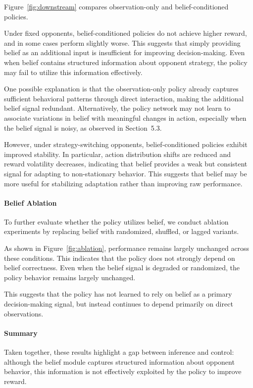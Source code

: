 \documentclass{article}
\begin{document}
Figure~\ref{fig:downstream} compares observation-only and belief-conditioned policies.

Under fixed opponents, belief-conditioned policies do not achieve higher reward, and in some cases perform slightly worse. 
This suggests that simply providing belief as an additional input is insufficient for improving decision-making. 
Even when belief contains structured information about opponent strategy, the policy may fail to utilize this information effectively.

One possible explanation is that the observation-only policy already captures sufficient behavioral patterns through direct interaction, 
making the additional belief signal redundant. 
Alternatively, the policy network may not learn to associate variations in belief with meaningful changes in action, 
especially when the belief signal is noisy, as observed in Section~5.3.

However, under strategy-switching opponents, belief-conditioned policies exhibit improved stability. 
In particular, action distribution shifts are reduced and reward volatility decreases, 
indicating that belief provides a weak but consistent signal for adapting to non-stationary behavior. 
This suggests that belief may be more useful for stabilizing adaptation rather than improving raw performance.

\paragraph{Belief Ablation}

To further evaluate whether the policy utilizes belief, we conduct ablation experiments by replacing belief with randomized, shuffled, or lagged variants.

As shown in Figure~\ref{fig:ablation}, performance remains largely unchanged across these conditions. 
This indicates that the policy does not strongly depend on belief correctness. 
Even when the belief signal is degraded or randomized, the policy behavior remains largely unchanged.

This suggests that the policy has not learned to rely on belief as a primary decision-making signal, 
but instead continues to depend primarily on direct observations.

\paragraph{Summary}

Taken together, these results highlight a gap between inference and control: 
although the belief module captures structured information about opponent behavior, 
this information is not effectively exploited by the policy to improve reward.
\end{document}
